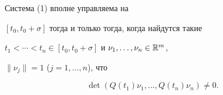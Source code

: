 \begin{cornonum} Система (1) вполне управляема на


$[t_0,t_0+\sigma]$ тогда и только тогда, когда найдутся такие


$t_{1}<\dotsb<t_{n}\in [t_0,t_0+\sigma]$ и $\nu_{1},\dotsc,\nu_{n}\in\Bbb R^m$,


$\|\nu_j\|=1$ ($j=1,\dotsc,n$), что


\begin{equation}


\det(Q(t_{1})\nu_{1},\dotsc,Q(t_{n})\nu_{n})\ne 0.


\end{equation}


\end{cornonum}





